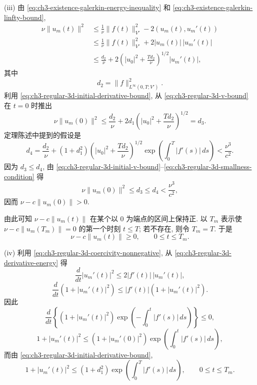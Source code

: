 \begin{Proof}
\hypertarget{chapter-03-page-221}{}
(iii) 由 \eqref{eq:ch3-existence-galerkin-energy-inequality} 和 \eqref{eq:ch3-existence-galerkin-linfty-bound},
\begin{equation}
\begin{aligned}
\nu\lVert u_m(t)\rVert^2
&\leq\frac1\nu\lVert f(t)\rVert_{V'}^2-2(u_m(t),u_m'(t))\\
&\leq\frac1\nu\lVert f(t)\rVert_{V'}^2+2|u_m(t)|\,|u_m'(t)|\\
&\leq\frac{d_2}{\nu}
+2\left(|u_0|^2+\frac{Td_2}{\nu}\right)^{1/2}|u_m'(t)|,
\end{aligned}
\label{eq:ch3-regular-3d-v-bound}
\end{equation}
其中
\begin{equation}
d_2=\lVert f\rVert_{L^\infty(0,T;V')}^2.
\label{eq:ch3-regular-3d-d2}
\end{equation}
利用 \eqref{eq:ch3-regular-3d-initial-derivative-bound}, 从 \eqref{eq:ch3-regular-3d-v-bound} 在 $t=0$ 时推出
\begin{equation}
\nu\lVert u_m(0)\rVert^2
\leq\frac{d_2}{\nu}+2d_1
\left(|u_0|^2+\frac{Td_2}{\nu}\right)^{1/2}=d_3.
\label{eq:ch3-regular-3d-initial-v-bound}
\end{equation}
定理陈述中提到的假设是
\begin{equation}
d_4=\frac{d_2}{\nu}+(1+d_1^2)
\left(|u_0|^2+\frac{Td_2}{\nu}\right)^{1/2}
\exp\left(\int_0^T|f'(s)|\,ds\right)<\frac{\nu^3}{c^2}.
\label{eq:ch3-regular-3d-smallness-condition}
\end{equation}
因为 $d_3\leq d_4$, 由 \eqref{eq:ch3-regular-3d-initial-v-bound}--\eqref{eq:ch3-regular-3d-smallness-condition} 得
\[
\nu\lVert u_m(0)\rVert^2\leq d_3\leq d_4<\frac{\nu^3}{c^2},
\]
因而 $\nu-c\lVert u_m(0)\rVert>0$.

由此可知 $\nu-c\lVert u_m(t)\rVert$ 在某个以 $0$ 为端点的区间上保持正. 以 $T_m$ 表示使 $\nu-c\lVert u_m(T_m)\rVert=0$ 的第一个时刻 $t\leq T$; 若不存在, 则令 $T_m=T$. 于是
\begin{equation}
\nu-c\lVert u_m(t)\rVert\geq0,
\qquad0\leq t\leq T_m.
\label{eq:ch3-regular-3d-coercivity-nonnegative}
\end{equation}

(iv) 利用 \eqref{eq:ch3-regular-3d-coercivity-nonnegative}, 从 \eqref{eq:ch3-regular-3d-derivative-energy} 得
\[
\frac d{dt}|u_m'(t)|^2\leq2|f'(t)|\,|u_m'(t)|,
\]
\[
\frac d{dt}(1+|u_m'(t)|^2)
\leq|f'(t)|(1+|u_m'(t)|^2).
\]
因此
\[
\frac d{dt}\left\{(1+|u_m'(t)|^2)
\exp\left(-\int_0^t|f'(s)|\,ds\right)\right\}\leq0,
\]
\[
1+|u_m'(t)|^2\leq(1+|u_m'(0)|^2)
\exp\left(\int_0^t|f'(s)|\,ds\right),
\]
而由 \eqref{eq:ch3-regular-3d-initial-derivative-bound},
\begin{equation}
1+|u_m'(t)|^2\leq(1+d_1^2)
\exp\left(\int_0^T|f'(s)|\,ds\right),
\qquad0\leq t\leq T_m.
\label{eq:ch3-regular-3d-derivative-linfty-bound}
\end{equation}


\end{Proof}

